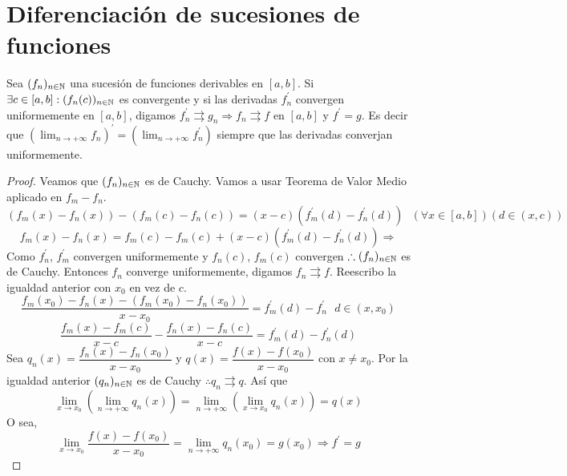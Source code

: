 \section{Diferenciación de sucesiones de funciones}

\begin{theorem}
  Sea $(f_n)_{n \in \mathbb{N}}$ una sucesión de funciones derivables en $[a, b]$. Si $\exists c \in [a, b] : (f_n(c))_{n \in \mathbb{N}}$ es convergente y si las derivadas $f_n^{\prime}$ convergen uniformemente en $[a, b]$, digamos $f_n^{\prime} \rightrightarrows g_n \Rightarrow f_n \rightrightarrows f$ en $[a, b]$ y $f^{\prime} = g$.
  Es decir que $(\lim_{n \to +\infty} f_n)^{\prime} = (\lim_{n \to +\infty} f_n^{\prime})$ siempre que las derivadas converjan uniformemente.
  \begin{proof}
    Veamos que $(f_n)_{n \in \mathbb{N}}$ es de Cauchy. Vamos a usar Teorema de Valor Medio aplicado en $f_m - f_n$. \begin{equation}
      (f_m(x) - f_n(x)) - (f_m(c) - f_n(c)) = (x-c)(f_m^{\prime}(d) - f_n^{\prime}(d)) \text{  } (\forall x \in [a, b])(d \in (x, c))
    \end{equation}
    \begin{equation}
      f_m(x) - f_n(x) = f_m(c) - f_m(c) + (x-c) (f_m^{\prime}(d) - f_n^{\prime}(d)) \Rightarrow
    \end{equation} Como $f_n^{\prime}$, $f_m^{\prime}$ convergen uniformemente y $f_n(c)$, $f_m(c)$ convergen $\therefore (f_n)_{n \in \mathbb{N}}$ es de Cauchy. Entonces $f_n$ converge uniformemente, digamos $f_n \rightrightarrows f$. Reescribo la igualdad anterior con $x_0$ en vez de $c$.
    \begin{equation}
      \dfrac{f_m(x_0) - f_n(x) - (f_m(x_0) - f_n(x_0))}{x - x_0} = f_m^{\prime}(d) - f_n^{\prime} \text{  } d \in (x, x_0)
    \end{equation}
    \begin{equation}
      \dfrac{f_m(x) - f_m(c)}{x - c} - \dfrac{f_n(x) - f_n(c)}{x - c} = f_m^{\prime}(d) - f_n^{\prime}(d)
    \end{equation}
    Sea $q_n(x) = \dfrac{f_n(x)-f_n(x_0)}{x-x_0}$ y $q(x) = \dfrac{f(x)-f(x_0)}{x - x_0}$ con $x \neq x_0$. Por la igualdad anterior $(q_n)_{n \in \mathbb{N}}$ es de Cauchy $\therefore q_n \rightrightarrows q$. Así que \begin{equation}
      \lim_{x \to x_0} (\lim_{n \to +\infty} q_n(x)) = \lim_{n \to +\infty}(\lim_{x \to x_0} q_n(x)) = q(x)
    \end{equation} O sea, \begin{equation}
      \lim_{x \to x_0} \dfrac{f(x) - f(x_0)}{x-x_0} = \lim_{n \to +\infty} q_n(x_0) = g(x_0) \Rightarrow f^{\prime} = g
    \end{equation}
  \end{proof}
\end{theorem}

